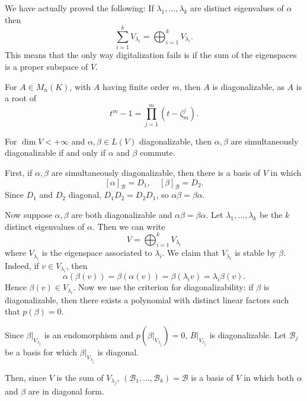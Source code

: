\documentclass[12pt]{article}
\begin{document}
\begin{remark}
	We have actually proved the following: If $\lambda_1, \ldots, \lambda_k$ are distinct eigenvalues of $\alpha$ then
	\[
	\sum_{i = 1}^{k}V_{\lambda_i} = \bigoplus_{i = 1}^{k} V_{\lambda_i}
	.\]
	This means that the only way digitalization fails is if the sum of the eigenspaces is a proper subspace of $V$.
\end{remark}

\begin{exbox}
	For $A \in M_n(K)$, with $A$ having finite order $m$, then $A$ is diagonalizable, as $A$ is a root of
	\[
		t^{m}- 1 = \prod_{j = 1}^{m}(t - \zeta_m^{j})
	.\]
\end{exbox}

\begin{theorem}
	For $\dim V < +\infty$ and $\alpha, \beta \in L(V)$ diagonalizable, then $\alpha, \beta$ are simultaneously diagonalizable if and only if $\alpha$ and $\beta$ commute.
\end{theorem}

\begin{proofbox}
	First, if $\alpha, \beta$ are simultaneously diagonalizable, then there is a basis of $V$ in which
	\[
		[\alpha]_{\mathcal{B}} = D_1, \quad [\beta]_{\mathcal{B}} = D_2
	.\]
	Since $D_1$ and $D_2$ diagonal, $D_1D_2 = D_2D_1$, so $\alpha \beta = \beta \alpha$.

	Now suppose $\alpha, \beta$ are both diagonalizable and $\alpha \beta = \beta \alpha$. Let $\lambda_1, \ldots, \lambda_k$ be the $k$ distinct eigenvalues of $\alpha$. Then we can write
	\[
	V = \bigoplus_{i = 1}^{k} V_{\lambda_i}
	\]
	where $V_{\lambda_i}$ is the eigenspace associated to $\lambda_i$. We claim that $V_{\lambda_i}$ is stable by $\beta$. Indeed, if $v \in V_{\lambda_i}$, then
	\[
		\alpha (\beta(v)) = \beta (\alpha(v)) = \beta (\lambda_i v) = \lambda_i \beta(v)
	.\]
	Hence $\beta(v) \in V_{\lambda_i}$. Now we use the criterion for diagonalizability: if $\beta$ is diagonalizable, then there exists a polynomial with distinct linear factors such that $p(\beta) = 0$.

	Since $\beta|_{V_{\lambda_j}}$ is an endomorphism and $p(\beta|_{V_{\lambda_j}}) = 0$, $B|_{V_{\lambda_j}}$ is diagonalizable. Let $\mathcal{B}_j$ be a basis for which $\beta|_{V_{\lambda_j}}$ is diagonal.

	Then, since $V$ is the sum of $V_{\lambda_j}$, $(\mathcal{B}_1 , \ldots, \mathcal{B}_k) = \mathcal{B}$ is a basis of $V$ in which both $\alpha$ and $\beta$ are in diagonal form.
\end{proofbox}
\end{document}
